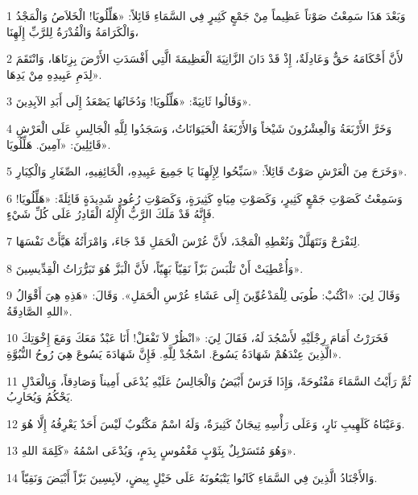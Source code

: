 \par 1 وَبَعْدَ هَذَا سَمِعْتُ صَوْتاً عَظِيماً مِنْ جَمْعٍ كَثِيرٍ فِي السَّمَاءِ قَائِلاً: «هَلِّلُويَا! الْخَلاَصُ وَالْمَجْدُ وَالْكَرَامَةُ وَالْقُدْرَةُ لِلرَّبِّ إِلَهِنَا،
\par 2 لأَنَّ أَحْكَامَهُ حَقٌّ وَعَادِلَةٌ، إِذْ قَدْ دَانَ الزَّانِيَةَ الْعَظِيمَةَ الَّتِي أَفْسَدَتِ الأَرْضَ بِزِنَاهَا، وَانْتَقَمَ لِدَمِ عَبِيدِهِ مِنْ يَدِهَا».
\par 3 وَقَالُوا ثَانِيَةً: «هَلِّلُويَا! وَدُخَانُهَا يَصْعَدُ إِلَى أَبَدِ الآبِدِينَ».
\par 4 وَخَرَّ الأَرْبَعَةُ وَالْعِشْرُونَ شَيْخاً وَالأَرْبَعَةُ الْحَيَوَانَاتُ، وَسَجَدُوا لِلَّهِ الْجَالِسِ عَلَى الْعَرْشِ قَائِلِينَ: «آمِينَ. هَلِّلُويَا».
\par 5 وَخَرَجَ مِنَ الْعَرْشِ صَوْتٌ قَائِلاً: «سَبِّحُوا لِإِلَهِنَا يَا جَمِيعَ عَبِيدِهِ، الْخَائِفِيهِ، الصِّغَارِ وَالْكِبَارِ».
\par 6 وَسَمِعْتُ كَصَوْتِ جَمْعٍ كَثِيرٍ، وَكَصَوْتِ مِيَاهٍ كَثِيرَةٍ، وَكَصَوْتِ رُعُودٍ شَدِيدَةٍ قَائِلَةً: «هَلِّلُويَا! فَإِنَّهُ قَدْ مَلَكَ الرَّبُّ الْإِلَهُ الْقَادِرُ عَلَى كُلِّ شَيْءٍ.
\par 7 لِنَفْرَحْ وَنَتَهَلَّلْ وَنُعْطِهِ الْمَجْدَ، لأَنَّ عُرْسَ الْحَمَلِ قَدْ جَاءَ، وَامْرَأَتُهُ هَيَّأَتْ نَفْسَهَا.
\par 8 وَأُعْطِيَتْ أَنْ تَلْبَسَ بَزّاً نَقِيّاً بَهِيّاً، لأَنَّ الْبَزَّ هُوَ تَبَرُّرَاتُ الْقِدِّيسِينَ».
\par 9 وَقَالَ لِيَ: «اكْتُبْ: طُوبَى لِلْمَدْعُوِّينَ إِلَى عَشَاءِ عُرْسِ الْحَمَلِ». وَقَالَ: «هَذِهِ هِيَ أَقْوَالُ اللهِ الصَّادِقَةُ».
\par 10 فَخَرَرْتُ أَمَامَ رِجْلَيْهِ لأَسْجُدَ لَهُ، فَقَالَ لِيَ: «انْظُرْ لاَ تَفْعَلْ! أَنَا عَبْدٌ مَعَكَ وَمَعَ إِخْوَتِكَ الَّذِينَ عِنْدَهُمْ شَهَادَةُ يَسُوعَ. اسْجُدْ لِلَّهِ. فَإِنَّ شَهَادَةَ يَسُوعَ هِيَ رُوحُ النُّبُوَّةِ».
\par 11 ثُمَّ رَأَيْتُ السَّمَاءَ مَفْتُوحَةً، وَإِذَا فَرَسٌ أَبْيَضُ وَالْجَالِسُ عَلَيْهِ يُدْعَى أَمِيناً وَصَادِقاً، وَبِالْعَدْلِ يَحْكُمُ وَيُحَارِبُ.
\par 12 وَعَيْنَاهُ كَلَهِيبِ نَارٍ، وَعَلَى رَأْسِهِ تِيجَانٌ كَثِيرَةٌ، وَلَهُ اسْمٌ مَكْتُوبٌ لَيْسَ أَحَدٌ يَعْرِفُهُ إِلَّا هُوَ.
\par 13 وَهُوَ مُتَسَرْبِلٌ بِثَوْبٍ مَغْمُوسٍ بِدَمٍ، وَيُدْعَى اسْمُهُ «كَلِمَةَ اللهِ».
\par 14 وَالأَجْنَادُ الَّذِينَ فِي السَّمَاءِ كَانُوا يَتْبَعُونَهُ عَلَى خَيْلٍ بِيضٍ، لاَبِسِينَ بَزّاً أَبْيَضَ وَنَقِيّاً.
